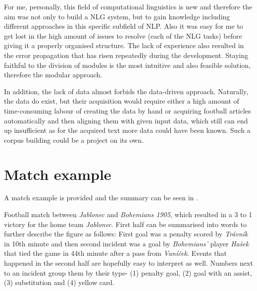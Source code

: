 For me, personally, this field of computational linguistics is new and therefore the aim  was not only to build a NLG system, but to gain knowledge including different approaches in this specific subfield of NLP. Also it was easy for me to get lost in the high amount of issues to resolve (each of the NLG tasks) before giving it a properly organised structure. The lack of experience also resulted in the error propagation that has risen repeatedly during the development. Staying faithful to the division of modules is the most intuitive and also feasible solution, therefore the modular approach. 

In addition, the lack of data almost forbids the data-driven approach. Naturally, the data do exist, but their acquisition would require either a high amount of time-consuming labour of creating the data by hand or acquiring football articles automatically and then aligning them with given input data, which still can end up insufficient as for the acquired text more data could have been known. Such a corpus building could be a project on its own.

\section{Match example}
A match example is provided and the summary can be seen in . 

Football match between \emph{Jablonec} and \emph{Bohemians 1905}, which resulted in a 3 to 1 victory for the home team \emph{Jablonec}. First half can be summarised into words to further describe the figure as follows: First goal was a penalty scored by \emph{Trávník} in 10th minute and then second incident was a goal by \emph{Bohemians'} player \emph{Hašek} that tied the game in 44th minute after a pass from \emph{Vaníček}. Events that happened in the second half are hopefully easy to interpret as well. Numbers next to an incident group them by their type- (1) penalty goal, (2) goal with an assist, (3) substitution and (4) yellow card. 

